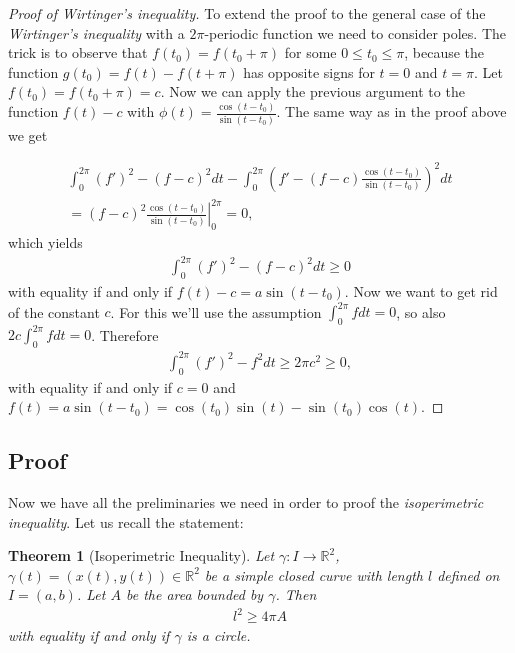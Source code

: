 \documentclass[12pt, a4paper, titlepage]{article}
\newtheorem{thm}{Theorem}
\begin{document}
\begin{proof}[Proof of Wirtinger's inequality] To extend the proof to the general case of the \textit{Wirtinger's inequality} with a $2\pi$-periodic function we need to consider poles. The trick is to observe that $f(t_0) = f(t_0+\pi)$ for some $0 \leq t_0 \leq \pi$, because the function $g(t_0) = f(t) - f(t+\pi)$ has opposite signs for $t = 0$ and $t = \pi$. Let $f(t_0) = f(t_0+\pi) = c$. Now we can apply the previous argument to the function $f(t)-c$ with $\phi(t) = \frac{\cos(t-t_0)}{\sin(t-t_0)}$. The same way as in the proof above we get

\begin{align*}
\int_{0}^{2\pi}(f')^2-(f-c)^2dt - \int_{0}^{2\pi}\left(f'-(f-c)\frac{\cos(t-t_0)}{\sin(t-t_0)}\right)^2dt \\
= \left.(f-c)^2\frac{\cos (t-t_0)}{\sin (t-t_0)}\right|^{2\pi}_0 = 0,
\end{align*}
which yields
\begin{align*}
\int_{0}^{2\pi}(f')^2-(f-c)^2dt \geq 0
\end{align*}
with equality if and only if $f(t) - c = a\sin(t-t_0).$
Now we want to get rid of the constant $c$. For this we'll use the assumption $\int_{0}^{2\pi}fdt = 0$, so also $2c\int_{0}^{2\pi}fdt=0$. Therefore
\begin{align*}
\int_{0}^{2\pi}(f')^2-f^2dt\geq 2\pi c^2 \geq 0,
\end{align*}
with equality if and only if $c=0$ and $f(t)=a\sin(t-t_0) = \cos(t_0)\sin(t)-\sin(t_0)\cos(t)$.
\end{proof}


\subsection{Proof}
Now we have all the preliminaries we need in order to proof the \textit{isoperimetric inequality}. Let us recall the statement:

\begin{thm}[Isoperimetric Inequality] Let $\gamma: I \rightarrow \mathbb{R}^2$, $\gamma(t) = (x(t),y(t)) \in \mathbb{R}^2$ be a simple closed curve with length $l$ defined on $I=(a,b)$. Let $A$ be the area bounded by $\gamma$. Then
\begin{align*}
l^2 \geq 4\pi A
\end{align*}
with equality if and only if $\gamma$ is a circle.
\end{thm}
\end{document}
